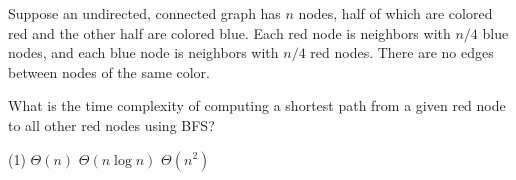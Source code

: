 \Needspace{2.5in}
\begin{prob}

    Suppose an undirected, connected graph has $n$ nodes, half of which are
    colored red and the other half are colored blue. Each red node is neighbors
    with $n/4$ blue nodes, and each blue node is neighbors with $n/4$ red
    nodes. There are no edges between nodes of the same color.

    What is the time complexity of computing a shortest path from a given red
    node to all other red nodes using BFS?

    \begin{choices}
        \choice \theta(1)
        \choice $\Theta(n)$
        \choice $\Theta(n \log n)$
        \correctchoice $\Theta(n^2)$
    \end{choices}



\end{prob}
